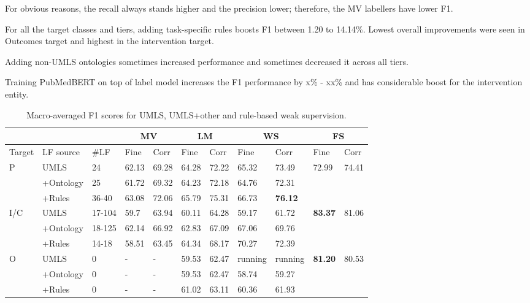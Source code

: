 \documentclass[10.7pt,]{article}
\begin{document}
For obvious reasons, the recall always stands higher and the precision lower; therefore, the MV labellers have lower F1.


For all the target classes and tiers, adding task-specific rules boosts F1 between 1.20 to 14.14\%.
Lowest overall improvements were seen in Outcomes target and highest in the intervention target.


Adding non-UMLS ontologies sometimes increased performance and sometimes decreased it across all tiers.


Training PubMedBERT on top of label model increases the F1 performance by x\% - xx\% and has considerable boost for the intervention entity.




\begin{table}[!ht]
    \centering
    \begin{tabular}{|l|l|l|l|l|l|l|l|l|l|l|}
        \hline
        \multicolumn{3}{|c|}{} &
        \multicolumn{2}{|c|}{MV} & \multicolumn{2}{|c|}{LM} & \multicolumn{2}{|c|}{WS} & \multicolumn{2}{|c|}{FS} \\
        \hline
        Target & LF source & \#LF & Fine & Corr & Fine & Corr & Fine & Corr & Fine & Corr \\
        \hline
        P & UMLS & 24 & 62.13 & 69.28 & 64.28 & 72.22 & 65.32 & 73.49 & 72.99 & 74.41 \\ 
        ~ & +Ontology & 25 & 61.72 & 69.32 & 64.23 & 72.18 & 64.76 & 72.31 & ~ & ~ \\ 
        ~ & +Rules & 36-40 & 63.08 & 72.06 & 65.79 & 75.31 & 66.73 & \textbf{76.12} & ~ & ~ \\ \hline
        I/C & UMLS & 17-104 &59.7 & 63.94 & 60.11 & 64.28 & 59.17 & 61.72 & \textbf{83.37} & 81.06 \\ 
        ~ & +Ontology & 18-125 & 62.14 & 66.92 & 62.83 & 67.09 & 67.06 & 69.76 & ~ & ~ \\ 
        ~ & +Rules & 14-18 & 58.51 & 63.45 & 64.34 & 68.17 & 70.27 & 72.39 & ~ & ~ \\  \hline
        O & UMLS & 0 & - & - & 59.53 & 62.47 & running & running & \textbf{81.20} & 80.53 \\ 
        ~ & +Ontology & 0 & - & - & 59.53 & 62.47 & 58.74 & 59.27 & ~ & ~ \\ 
        ~ & +Rules & 0 & - & - & 61.02 & 63.11 & 60.36 & 61.93 & ~ & ~ \\ \hline
    \end{tabular}
    \caption{\label{tab:res} Macro-averaged F1 scores for UMLS, UMLS+other and rule-based weak supervision.}
\end{table}
\end{document}
